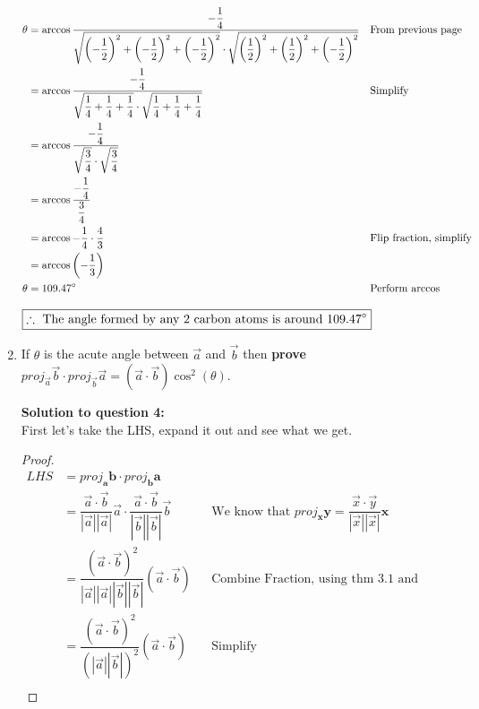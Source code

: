 \documentclass[12pt]{book}
\newcommand{\vectorproj}[2][]{\textit{proj}_{\vect{#1}}\vect{#2}}
\newcommand{\vect}{\mathbf}
\begin{document}
\begin{enumerate}
\addtolength{\jot}{1em}
\begin{align*}
  \theta &= \arccos \dfrac{-\dfrac{1}{4}}{\sqrt{\left(-\dfrac{1}{2} \right)^2 + \left(-\dfrac{1}{2} \right)^2 + \left(-\dfrac{1}{2} \right)^2} \cdot \sqrt{\left(\dfrac{1}{2} \right)^2 + \left(\dfrac{1}{2} \right)^2 + \left(-\dfrac{1}{2} \right)^2}} && \text{From previous page} \\
  &= \arccos \dfrac{-\dfrac{1}{4}}{\sqrt{\dfrac{1}{4} + \dfrac{1}{4} + \dfrac{1}{4}} \cdot \sqrt{\dfrac{1}{4} + \dfrac{1}{4} + \dfrac{1}{4}}} && \text{Simplify} \\
  &= \arccos \dfrac{-\dfrac{1}{4}}{\sqrt{\dfrac{3}{4}} \cdot \sqrt{\dfrac{3}{4}}} \\
  &= \arccos \dfrac{-\dfrac{1}{4}}{\dfrac{3}{4}} \\
  &= \arccos -\dfrac{1}{4}\cdot\dfrac{4}{3} && \text{Flip fraction, simplify} \\
  &= \arccos \left( -\dfrac{1}{3} \right) \\
  \theta &= 109.47 \degree && \text{Perform arccos}\\
\end{align*}

\begin{center}
  $\boxed{\therefore \text{ The angle formed by any 2 carbon atoms is around } 109.47 \degree }$
\end{center}

\newpage

\item If $\theta$ is the acute angle between $\vec{a}$ and $\vec{b}$ then \textbf{prove} $proj_{\vec{a}}\vec{b} \cdot proj_{\vec{b}}\vec{a} = (\vec{a} \cdot \vec{b}) \cos^2(\theta)$.

\vspace{0.3cm} 
\textbf{Solution to question 4:}\\
 First let's take the LHS, expand it out and see what we get.
\vspace{0.3cm}

\begin{proof}

\addtolength{\jot}{1em}
\begin{align*}
  LHS &= \vectorproj[a]{b} \cdot \vectorproj[b]{a} \\
   &= \dfrac{\vec{a} \cdot \vec{b}}{|\vec{a}||\vec{a}|}\vec{a} \cdot \dfrac{\vec{a} \cdot \vec{b}}{|\vec{b}||\vec{b}|}\vec{b} && \text{We know that } \vectorproj[x]{y} = \dfrac{\vec{x} \cdot \vec{y}}{|\vec{x}||\vec{x}|}\vect{x}\\
   &= \dfrac{(\vec{a} \cdot \vec{b})^2}{|\vec{a}||\vec{a}||\vec{b}||\vec{b}|}(\vec{a} \cdot \vec{b}) && \text{Combine Fraction, using thm 3.1 and algebraic manipuulation}\\
   &= \dfrac{(\vec{a} \cdot \vec{b})^2}{(|\vec{a}||\vec{b}|)^2}(\vec{a} \cdot \vec{b}) && \text{Simplify} \\
\end{align*}


\end{proof}
\end{enumerate}
\end{document}

